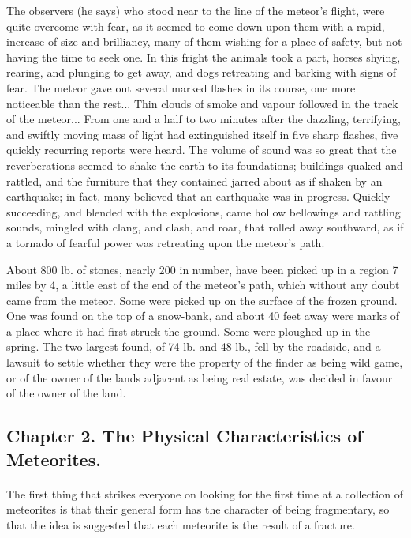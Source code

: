 \documentclass[a4paper, 12pt, oneside, polutonikogreek, english]{article}
\begin{document}
The observers (he says) who stood near to the line of the meteor's flight, were quite overcome with fear, as it seemed to come down upon them with a rapid, increase of size and brilliancy, many of them wishing for a place of safety, but not having the time to seek one. In this fright the animals took a part, horses shying, rearing, and plunging to get away, and dogs retreating and barking with signs of fear. The meteor gave out several marked flashes in its course, one more noticeable than the rest... Thin clouds of smoke and vapour followed in the track of the meteor... From one and a half to two minutes after the dazzling, terrifying, and swiftly moving mass of light had extinguished itself in five sharp flashes, five quickly recurring reports were heard. The volume of sound was so great that the reverberations seemed to shake the earth to its foundations; buildings quaked and rattled, and the furniture that they contained jarred about as if shaken by an earthquake; in fact, many believed that an earthquake was in progress. Quickly succeeding, and blended with the explosions, came hollow bellowings and rattling sounds, mingled with clang, and clash, and roar, that rolled away southward, as if a tornado of fearful power was retreating upon the meteor's path.

About 800 lb. of stones, nearly 200 in number, have been picked up in a region 7 miles by 4, a little east of the end of the meteor's path, which without any doubt came from the meteor. Some were picked up on the surface of the frozen ground. One was found on the top of a snow-bank, and about 40 feet away were marks of a place where it had first struck the ground. Some were ploughed up in the spring. The two largest found, of 74 lb. and 48 lb., fell by the roadside, and a lawsuit to settle whether they were the property of the finder as being wild game, or of the owner of the lands adjacent as being real estate, was decided in favour of the owner of the land.
\clearpage
\subsection{Chapter 2. The Physical Characteristics of Meteorites.}
\paragraph{}
The first thing that strikes everyone on looking for the first time at a collection of meteorites is that their general form has the character of being fragmentary, so that the idea is suggested that each meteorite is the result of a fracture.
\end{document}
